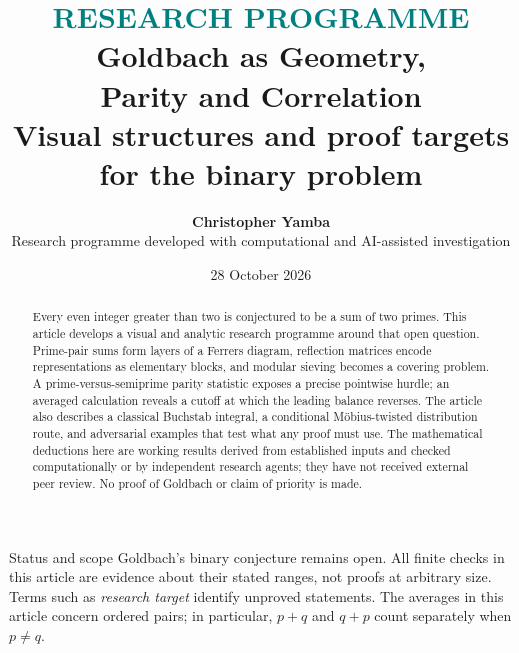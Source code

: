 \documentclass[11pt,a4paper]{article}
\title{\vspace{-1.5em}\textcolor{teal}{\large\sffamily RESEARCH PROGRAMME}\vspace{.6em}\\\textcolor{ink}{\Huge\bfseries Goldbach as Geometry,\\[.15em]Parity and Correlation}\\[.65em]\large Visual structures and proof targets for the binary problem}
\author{\textbf{Christopher Yamba}\\[-.1em]\small Research programme developed with computational and AI-assisted investigation}
\date{28 October 2026}
\begin{document}
\maketitle
\begin{abstract}
Every even integer greater than two is conjectured to be a sum of two primes. This article develops a visual and analytic research programme around that open question. Prime-pair sums form layers of a Ferrers diagram, reflection matrices encode representations as elementary blocks, and modular sieving becomes a covering problem. A prime-versus-semiprime parity statistic exposes a precise pointwise hurdle; an averaged calculation reveals a cutoff at which the leading balance reverses. The article also describes a classical Buchstab integral, a conditional M\"obius-twisted distribution route, and adversarial examples that test what any proof must use. The mathematical deductions here are working results derived from established inputs and checked computationally or by independent research agents; they have not received external peer review. No proof of Goldbach or claim of priority is made.
\end{abstract}
\begin{caution}{Status and scope}
Goldbach's binary conjecture remains open. All finite checks in this article are evidence about their stated ranges, not proofs at arbitrary size. Terms such as \emph{research target} identify unproved statements. The averages in this article concern ordered pairs; in particular, $p+q$ and $q+p$ count separately when $p\ne q$.
\end{caution}
\vspace{1em}
\begin{center}
\end{center}
\newpage
\end{document}
